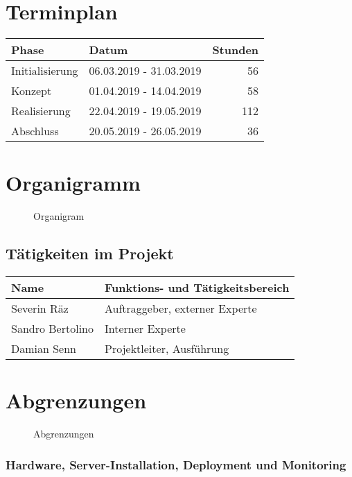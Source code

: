 \section{Terminplan}\label{terminplan}

\begin{longtable}[]{@{}llr@{}}
\toprule
Phase & Datum & Stunden\tabularnewline
\midrule
\endhead
Initialisierung & 06.03.2019 - 31.03.2019 &  56\tabularnewline
Konzept         & 01.04.2019 - 14.04.2019 &  58\tabularnewline
Realisierung    & 22.04.2019 - 19.05.2019 & 112\tabularnewline
Abschluss       & 20.05.2019 - 26.05.2019 &  36\tabularnewline
\bottomrule
\end{longtable}

\clearpage

\section{Organigramm}\label{organigramm}

\begin{figure}[!htb]
  \centering
  \def\svgwidth{\columnwidth}
  
  \caption{Organigram}
\end{figure}

\subsection{Tätigkeiten im Projekt}\label{tuxe4tigkeiten-im-projekt}

\begin{longtable}[]{@{}ll@{}}
\toprule
Name & Funktions- und Tätigkeitsbereich\tabularnewline
\midrule
\endhead
Severin Räz & Auftraggeber, externer Experte\tabularnewline
Sandro Bertolino & Interner Experte\tabularnewline
Damian Senn & Projektleiter, Ausführung\tabularnewline
\bottomrule
\end{longtable}

\clearpage

\section{Abgrenzungen}\label{abgrenzungen}

\begin{figure}[!htb]
  \centering
  \def\svgwidth{\columnwidth}
  
  \caption{Abgrenzungen}
\end{figure}

\subsubsection{Hardware, Server-Installation, Deployment und
Monitoring}\label{hardware-server-installation-deployment-und-monitoring}

